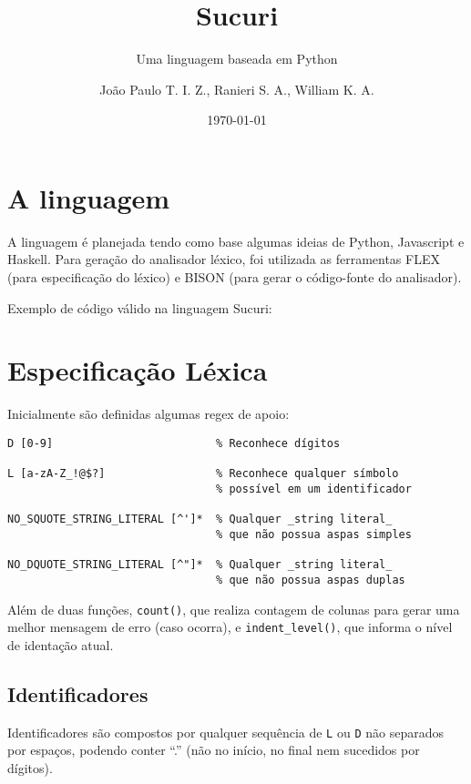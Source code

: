 \documentclass[headings=standardclasses, headings=big]{scrreprt}
\title{Sucuri}
\subtitle{Uma linguagem baseada em Python}
\author{João Paulo T. I. Z., Ranieri S. A., William K. A.}
\date{\today}
\begin{document}
\maketitle

\clearpage

\section{A linguagem}

A linguagem é planejada tendo como base algumas ideias de Python, Javascript e
Haskell. Para geração do analisador léxico, foi utilizada as ferramentas FLEX
(para especificação do léxico) e BISON (para gerar o código-fonte do
analisador).

Exemplo de código válido na linguagem Sucuri:



\clearpage

\section{Especificação Léxica}

Inicialmente são definidas algumas regex de apoio:

\begin{verbatim}
D [0-9]                         % Reconhece dígitos

L [a-zA-Z_!@$?]                 % Reconhece qualquer símbolo
                                % possível em um identificador

NO_SQUOTE_STRING_LITERAL [^']*  % Qualquer _string literal_
                                % que não possua aspas simples

NO_DQUOTE_STRING_LITERAL [^"]*  % Qualquer _string literal_
                                % que não possua aspas duplas
\end{verbatim}

Além de duas funções, \texttt{count()}, que realiza contagem de colunas para
gerar uma melhor mensagem de erro (caso ocorra), e \texttt{indent\_level()},
que informa o nível de identação atual.

\subsection{Identificadores}

Identificadores são compostos por qualquer sequência de \texttt{L} ou
\texttt{D} não separados por espaços, podendo conter ``.'' (não no início, no
final nem sucedidos por dígitos).
\end{document}
